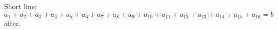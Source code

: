 \documentclass[10pt,leqno]{article}
\begin{document}
Short line:
\begin{equation} a_1 + a_2 + a_3 + a_4 + a_5 + a_6 + a_7 + a_8 + a_9 + a_{10} + a_{11} + a_{12} + a_{13} + a_{14} + a_{15} + a_{16} = b \end{equation}
after.
\end{document}
